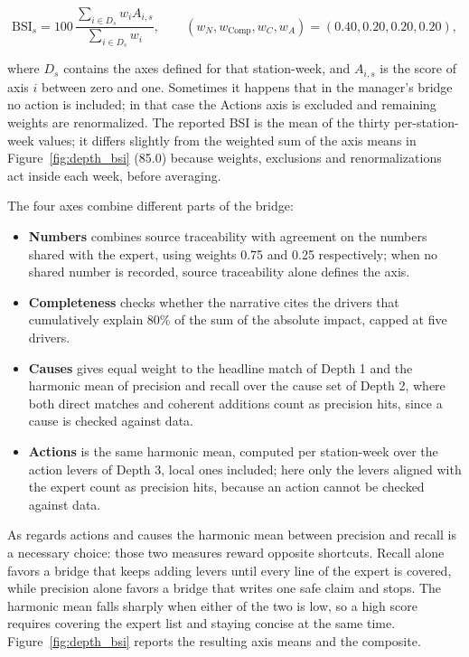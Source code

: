 \documentclass[12pt,a4paper,openright,twoside]{book}
\begin{document}
\begin{equation}
  \mathrm{BSI}_s = 100\,
  \frac{\sum_{i \in D_s} w_i A_{i,s}}
       {\sum_{i \in D_s} w_i},
  \qquad
  (w_N,w_{\mathrm{Comp}},w_C,w_A)=(0.40,0.20,0.20,0.20),
  \label{eq:bsi}
\end{equation}

where $D_s$ contains the axes defined for that station-week, and $A_{i,s}$ is the score of axis $i$ between zero and one.
Sometimes it happens that in the manager's bridge no action is included; in that case the Actions axis is excluded and remaining weights are renormalized.
The reported \ac{BSI} is the mean of the thirty per-station-week values; it differs slightly from the weighted sum of the axis means in Figure~\ref{fig:depth_bsi} (85.0) because weights, exclusions and renormalizations act inside each week, before averaging.

The four axes combine different parts of the bridge:

\begin{itemize}
  \item \textbf{Numbers} combines source traceability with agreement on the numbers shared with the expert, using weights 0.75 and 0.25 respectively; when no shared number is recorded, source traceability alone defines the axis.
  \item \textbf{Completeness} checks whether the narrative cites the drivers that cumulatively explain 80\% of the sum of the absolute impact, capped at five drivers.
  \item \textbf{Causes} gives equal weight to the headline match of Depth 1 and the harmonic mean of precision and recall over the cause set of Depth 2, where both direct matches and coherent additions count as precision hits, since a cause is checked against data.
  \item \textbf{Actions} is the same harmonic mean, computed per station-week over the action levers of Depth 3, local ones included; here only the levers aligned with the expert count as precision hits, because an action cannot be checked against data.
\end{itemize}

As regards actions and causes the harmonic mean between precision and recall is a necessary choice: those two measures reward opposite shortcuts.
Recall alone favors a bridge that keeps adding levers until every line of the expert is covered, while precision alone favors a bridge that writes one safe claim and stops.
The harmonic mean falls sharply when either of the two is low, so a high score requires covering the expert list and staying concise at the same time.
Figure~\ref{fig:depth_bsi} reports the resulting axis means and the composite.
\end{document}
